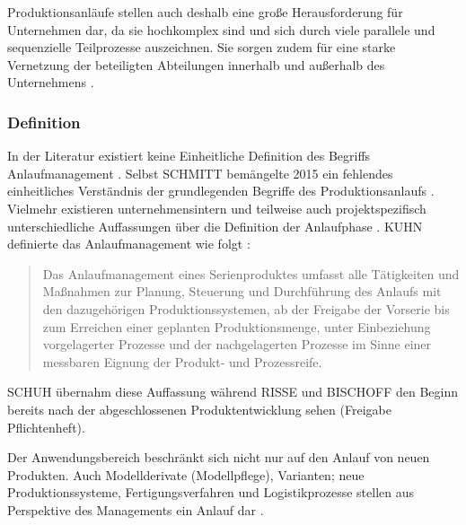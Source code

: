 Produktionsanläufe stellen auch deshalb eine große Herausforderung für Unternehmen dar, da sie hochkomplex sind und sich durch viele parallele und sequenzielle Teilprozesse auszeichnen. Sie sorgen zudem für eine starke Vernetzung der beteiligten Abteilungen innerhalb und außerhalb des Unternehmens \cite{Schuh2004}.


\subsubsection*{Definition}
In der Literatur existiert keine Einheitliche Definition des Begriffs Anlaufmanagement \cite[4]{Bischoff2007}. Selbst SCHMITT %
bemängelte 2015 ein fehlendes einheitliches Verständnis der grundlegenden Begriffe des Produktionsanlaufs \cite[1]{Schmitt2015}. Vielmehr existieren unternehmensintern und teilweise auch projektspezifisch unterschiedliche Auffassungen über die Definition der Anlaufphase \cite[11]{Grosshenning2005}. KUHN %
definierte das Anlaufmanagement wie folgt \cite[8]{Kuhn2002}: 
\begin{quotation}
Das Anlaufmanagement eines Serienproduktes umfasst alle Tätigkeiten und Maßnahmen zur Planung, Steuerung und Durchführung des Anlaufs mit den dazugehörigen Produktionssystemen, ab der Freigabe der Vorserie bis zum Erreichen einer geplanten Produktionsmenge, unter Einbeziehung vorgelagerter Prozesse und der nachgelagerten Prozesse im Sinne einer messbaren Eignung der Produkt- und Prozessreife.
\end{quotation}
SCHUH übernahm diese Auffassung \cite{Schuh08a} während RISSE und BISCHOFF den Beginn bereits nach der abgeschlossenen Produktentwicklung sehen \cite{Risse2002, Bischoff2007} (Freigabe Pflichtenheft).

Der Anwendungsbereich beschränkt sich nicht nur auf den Anlauf von neuen Produkten. Auch Modellderivate (Modellpflege), Varianten; neue Produktionssysteme, Fertigungsverfahren und Logistikprozesse stellen aus Perspektive des Managements ein Anlauf dar \cite[6]{Bischoff2007}. %




% 
%  
% 
% 
% 
% 
% 
% 
% 
% 
